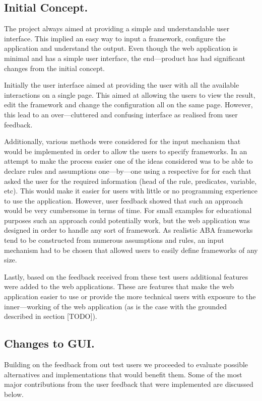\subsection{Initial Concept.}
The project always aimed at providing a simple and understandable user interface. This implied an easy way to input a framework, configure the application and understand the output. Even though the web application is minimal and has a simple user interface, the end---product has had significant changes from the initial concept.

Initially the user interface aimed at providing the user with all the available interactions on a single page. This aimed at allowing the users to view the result, edit the framework and change the configuration all on the same page. However, this lead to an over---cluttered and confusing interface as realised from user feedback.

Additionally, various methods were considered for the input mechanism that would be implemented in order to allow the users to specify frameworks. In an attempt to make the process easier one of the ideas considered was to be able to declare rules and assumptions one---by---one using a respective for for each that asked the user for the required information (head of the rule, predicates, variable, etc). This would make it easier for users with little or no programming experience to use the application. However, user feedback showed that such an approach would be very cumbersome in terms of time. For small examples for educational purposes such an approach could potentially work, but the web application was designed in order to handle any sort of framework. As realistic ABA frameworks tend to be constructed from numerous assumptions and rules, an input mechanism had to be chosen that allowed users to easily define frameworks of any size.

Lastly, based on the feedback received from these test users additional features were added to the web applications. These are features that make the web application easier to use or provide the more technical users with exposure to the inner---working of the web application (as is the case with the grounded described in section [TODO]).

\subsection{Changes to GUI.}
Building on the feedback from out test users we proceeded to evaluate possible alternatives and implementations that would benefit them. Some of the most major contributions from the user feedback that were implemented are discussed below.

